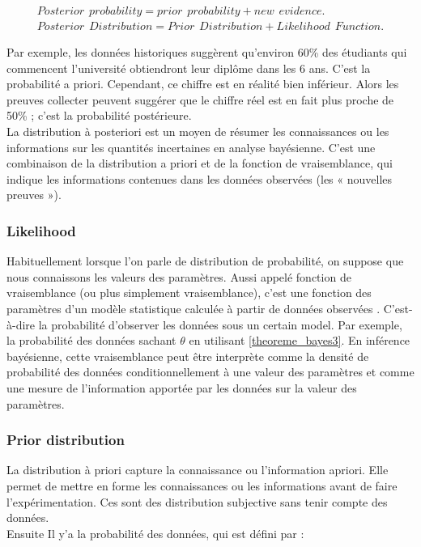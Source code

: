 \begin{equation}
    \begin{split}
		Posterior \hspace{5pt} probability = prior \hspace{5pt} probability + new \hspace{5pt} evidence. \\
        Posterior \hspace{5pt} Distribution = Prior \hspace{5pt} Distribution + Likelihood \hspace{5pt} Function.
	\end{split}
	\label{posterior_probability_distribution}
\end{equation}

Par exemple, les données historiques suggèrent qu'environ 60\% des étudiants qui commencent l'université obtiendront leur diplôme dans les 6 ans. C'est la probabilité a priori. Cependant, ce chiffre est en réalité bien inférieur. Alors les preuves collecter peuvent suggérer que le chiffre réel est en fait plus proche de 50\% ; c'est la probabilité postérieure. \\
La distribution à posteriori est un moyen de résumer les connaissances ou les informations sur les quantités incertaines en analyse bayésienne. C'est une combinaison de la distribution a priori et de la fonction de vraisemblance, qui indique les informations contenues dans les données observées (les « nouvelles preuves »).

\subsubsection{Likelihood}
Habituellement lorsque l’on parle de distribution de probabilité, on suppose que nous connaissons les valeurs des paramètres. Aussi appelé fonction de vraisemblance (ou plus simplement vraisemblance), c’est une fonction des paramètres d'un modèle statistique calculée à partir de données observées \cite{fisher1922mathematical}. C’est-à-dire la probabilité d’observer les données sous un certain model. Par exemple, la probabilité des données sachant \(\displaystyle \theta \) en utilisant \ref{theoreme_bayes3}.
En inférence bayésienne, cette vraisemblance peut être interprète comme la densité de probabilité des données conditionnellement à une valeur des paramètres et comme une mesure de l'information apportée par les données sur la valeur des paramètres.

\subsubsection{Prior distribution}
La distribution à priori capture la connaissance ou l’information apriori. Elle permet de mettre en forme les connaissances ou les informations avant de faire l’expérimentation. Ces sont des distribution subjective sans tenir compte des données. \\
Ensuite Il y’a la probabilité des données, qui est défini par :

